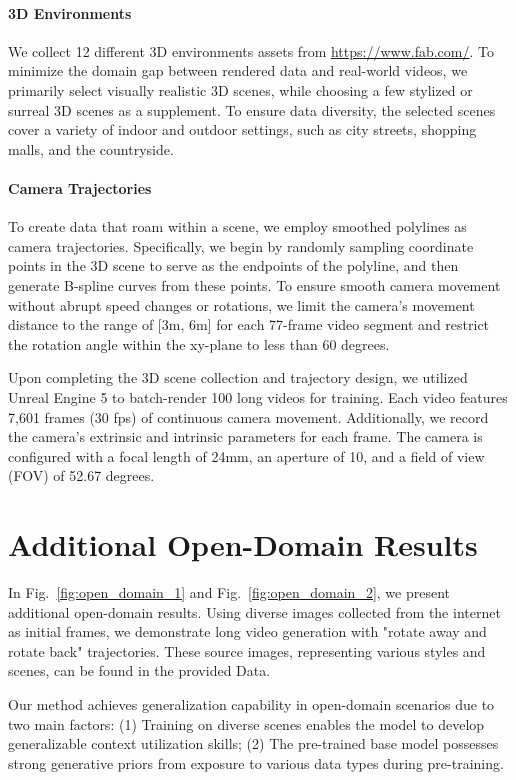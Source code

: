 \paragraph{3D Environments} We collect 12 different 3D environments assets from \url{https://www.fab.com/}. To minimize the domain gap between rendered data and real-world videos, we primarily select visually realistic 3D scenes, while choosing a few stylized or surreal 3D scenes as a supplement. To ensure data diversity, the selected scenes cover a variety of indoor and outdoor settings, such as city streets, shopping malls, and the countryside.

\paragraph{Camera Trajectories} To create data that roam within a scene, we employ smoothed polylines as camera trajectories. Specifically, we begin by randomly sampling coordinate points in the 3D scene to serve as the endpoints of the polyline, and then generate B-spline curves from these points. To ensure smooth camera movement without abrupt speed changes or rotations, we limit the camera's movement distance to the range of [3m, 6m] for each 77-frame video segment and restrict the rotation angle within the xy-plane to less than 60 degrees.

Upon completing the 3D scene collection and trajectory design, we utilized Unreal Engine 5 to batch-render 100 long videos for training. Each video features 7,601 frames (30 fps) of continuous camera movement. Additionally, we record the camera's extrinsic and intrinsic parameters for each frame. The camera is configured with a focal length of 24mm, an aperture of 10, and a field of view (FOV) of 52.67 degrees.

\section{Additional Open-Domain Results}

In Fig.~\ref{fig:open_domain_1} and Fig.~\ref{fig:open_domain_2}, we present additional open-domain results. Using diverse images collected from the internet as initial frames, we demonstrate long video generation with "rotate away and rotate back" trajectories. These source images, representing various styles and scenes, can be found in the provided Data.

Our method achieves generalization capability in open-domain scenarios due to two main factors:
(1) Training on diverse scenes enables the model to develop generalizable context utilization skills;
(2) The pre-trained base model possesses strong generative priors from exposure to various data types during pre-training.

